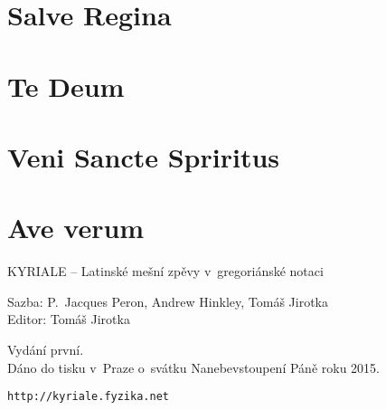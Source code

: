 \documentclass[12pt]{article} %
\begin{document}
\section{Salve Regina}


\section{Te Deum}


\section{Veni Sancte Spriritus}


\section{Ave verum}




\newpage
\tableofcontents




\newpage
\thispagestyle{empty}
\mbox{}

\newpage
\thispagestyle{empty}
\mbox{}

\begin{centering}
\setlength{\parskip}{1em}
\vspace{16cm}

	KYRIALE -- Latinské mešní zpěvy v~gregoriánské notaci

	Sazba: P.~Jacques Peron, Andrew Hinkley, Tomáš Jirotka\\
	Editor: Tomáš Jirotka

	Vydání první.\\
	Dáno do tisku v~Praze o~svátku Nanebevstoupení Páně roku 2015.

	{\tt http://kyriale.fyzika.net}

\end{centering}
\end{document}

